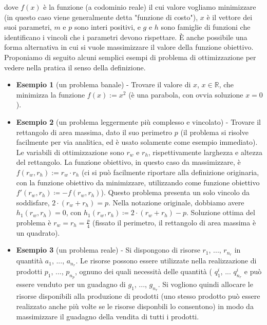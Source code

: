 \documentclass[12pt]{article}
\begin{document}
dove $f(x)$ è la funzione (a codominio reale) il cui valore vogliamo minimizzare (in questo caso viene generalmente detta "funzione di costo"), $x$ è il vettore dei suoi parametri, $m$ e $p$ sono interi positivi, e $g$ e $h$ sono famiglie di funzioni che identificano i vincoli che i parametri devono rispettare.
È anche possibile una forma alternativa in cui si vuole massimizzare il valore della funzione obiettivo.\newline
\newline
Proponiamo di seguito alcuni semplici esempi di problema di ottimizzazione per vedere nella pratica il senso della definizione.
\begin{itemize}
\item \textbf{Esempio 1} (un problema banale) - Trovare il valore di $x$, $x\in \mathbb{R}$, che minimizza la funzione $f(x) := x^2$ (è una parabola, con ovvia soluzione $x = 0$).

\item \textbf{Esempio 2} (un problema leggermente più complesso e vincolato) - Trovare il rettangolo di area massima, dato il suo perimetro $p$ (il problema si risolve facilmente per via analitica, ed è usato solamente come esempio immediato). Le variabili di ottimizzazione sono $r_w$ e $r_h$, rispettivamente larghezza e altezza del rettangolo. La funzione obiettivo, in questo caso da massimizzare, è $f(r_w, r_h) := r_w \cdot r_h$ (ci si può facilmente riportare alla definizione originaria, con la funzione obiettivo da minimizzare, utilizzando come funzione obiettivo $f'(r_w, r_h) \coloneqq -f(r_w, r_h)$). Questo problema presenta un solo vincolo da soddisfare, $2 \cdot (r_w+r_h) = p$. Nella notazione originale, dobbiamo avere $h_1(r_w, r_h) = 0$, con $h_1(r_w, r_h) \coloneqq 2 \cdot (r_w+r_h)-p$. Soluzione ottima del problema è $r_w = r_h = \frac{p}{4}$ (fissato il perimetro, il rettangolo di area massima è un quadrato).

\item \textbf{Esempio 3} (un problema reale) - Si dispongono di risorse $r_1$, ..., $r_{n_r}$ in quantità $a_1$, ..., $a_{n_r}$. Le risorse possono essere utilizzate nella realizzazione di prodotti $p_1$, ..., $p_{n_p}$, ognuno dei quali necessità delle quantità ( $q^i_{1}$, ... $q^i_{n_r}$ e può essere venduto per un guadagno di $g_1$, ..., $g_{n_r}$. Si vogliono quindi allocare le risorse disponibili alla produzione di prodotti (uno stesso prodotto può essere realizzato anche più volte se le risorse disponbili lo consentono) in modo da massimizzare il guadagno della vendita di tutti i prodotti.

\end{itemize}
\end{document}
